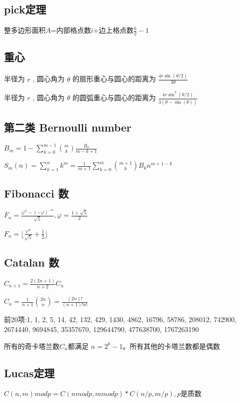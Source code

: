 \subsection{pick定理}
整多边形面积$A$=内部格点数$i$+边上格点数$\frac{b}{2}-1$\par

\subsection{重心}
半径为 $r$ , 圆心角为 $\theta$ 的扇形重心与圆心的距离为 $\frac{4r\sin(\theta/2)}{3\theta}$ \par
半径为 $r$ , 圆心角为 $\theta$ 的圆弧重心与圆心的距离为 $\frac{4r\sin^3(\theta/2)}{3(\theta-\sin(\theta))}$ \par

\subsection{第二类 Bernoulli number}
$B_m = 1 - \sum_{k=0}^{m-1}{\binom{m}{k}\frac{B_{k}}{m-k+1}}$\par
$S_m(n) = \sum_{k=1}^{n}{k^{m}} = \frac{1}{m+1}\sum_{k=0}^{m}{\binom{m+1}{k}B_{k}n^{m+1-k}}$\par

\subsection{Fibonacci 数}
$F_n=\frac{\varphi^{n}-(-\varphi)^{-n}}{\sqrt{5}},\varphi=\frac{1+\sqrt{5}}{2}$\par
$F_n=\lfloor \frac{\varphi^n}{\sqrt{5}}+\frac{1}{2}\rfloor$

\subsection{Catalan 数}
$C_{n+1}=\frac{2(2n+1)}{n+2}C_n$\par
$C_n=\frac{1}{n+1}\binom{2n}{n}=\frac{(2n)!}{(n+1)!n!}$\par
前20项:1, 1, 2, 5, 14, 42, 132, 429, 1430, 4862, 16796, 58786, 208012, 742900, 2674440, 9694845, 35357670, 129644790, 477638700, 1767263190\par
所有的奇卡塔兰数$C_n$都满足 $\displaystyle n=2^{k}-1$。所有其他的卡塔兰数都是偶数

\subsection{Lucas定理}
$C(n,m) mod p = C(n mod p, m mod p) * C(n / p, m / p),p$是质数\par

